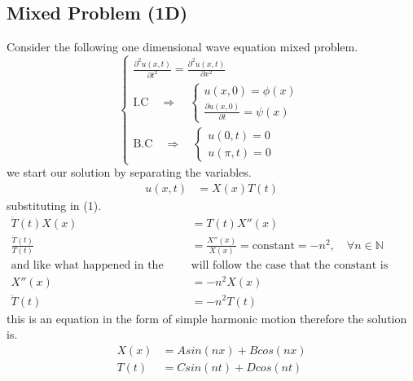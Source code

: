 \documentclass[]{article}
\begin{document}
\subsection{Mixed Problem (1D)}
Consider the following one dimensional wave equation mixed problem.
\begin{equation}
    \begin{cases}
        \displaystyle \frac{\partial^2 u\left(x,t\right)}{\partial t^2}=\frac{\partial^2 u\left(x,t\right)}{\partial x^2}
        \\
        \text{I.C} \quad \Longrightarrow \quad 
        \begin{cases}
            u\left(x,0 \right) = \phi\left(x\right)
            \\
            \frac{\partial u\left(x,0 \right)}{\partial t} = \psi\left(x\right)
        \end{cases}
        \\
        \text{B.C} \quad \Longrightarrow \quad 
        \begin{cases}
            u\left(0,t \right) = 0
            \\
            u\left(\pi,t\right)=0
        \end{cases}   
    \end{cases}
\end{equation}
we start our solution by separating the variables.
\begin{align}
u\left(x,t\right) &= X\left(x\right)T\left(t\right)
\end{align}
substituting in (1).
\begin{align*}
\ddot{T}\left(t\right)X\left(x\right)&=T\left(t\right)X''\left(x\right)
\\
\frac{\ddot{T}\left(t\right)}{T\left(t\right)} &= \frac{X''\left(x\right)}{X\left(x\right)}= \text{constant} = - n^2,\quad \forall n \in \mathbb{N}
\\
\text{and like what happened in the heat equation we }&\text{will follow the case that the constant is negative}
\\
X''\left(x\right)&=-n^2 X\left(x\right)
\\
\ddot{T}\left(t\right) &= -n^2 T\left(t\right)
\end{align*}
this is an equation in the form of simple harmonic motion therefore the solution is.
\begin{align*}
X\left(x\right) &= Asin\left(nx\right)+Bcos\left(nx\right)
\\
T\left(t\right) &= Csin\left(nt\right)+Dcos\left(nt\right)
\end{align*}
\end{document}
